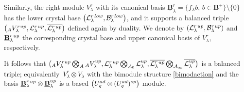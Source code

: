 \documentclass[11pt]{article}
\numberwithin{equation}{section}
\numberwithin{equation}{section}
\theoremstyle{definition}
\newcommand{\Ll}{{\mathcal L}}
\begin{document}
Similarly, the right module $V_\lambda^r$ with its canonical basis $\underline{\mathbf{B}}_\lambda^r{}=\{f_\lambda b,\, b\in \mathbf{B}^+\}\setminus \{0\}$ has the lower crystal base $\big(\Ll_{\lambda}^r{}^{\rm low},\mathcal{B}_\lambda^r{}^{\rm low}\big)$, and it supports a balanced triple $\big({}_AV_\lambda^r{}^{\rm up},\Ll_{\lambda} ^r{}^{\rm up},\overline{\Ll_{\lambda} ^r{}^{\rm up}}\big)$ defined again by duality. We denote by $(\Ll_{\lambda}^r{}^{\rm up},\mathcal{B}_\lambda^r{}^{\rm up})$ and $\underline{\mathbf{B}}_\lambda^r{}^{\rm up}$ the corresponding crystal base and upper canonical basis of $V_\lambda^r$, respectively.

It follows that $\big({}_AV_\lambda^r{}^{\rm up}\bigotimes_A {}_AV_\lambda^{\rm up},\Ll_{\lambda}^r{}^{\rm up} \bigotimes_{\mathcal{A}_0}\Ll_{\lambda}^{\rm up},\overline{\Ll_{\lambda}^r{}^{\rm up}}\bigotimes_{\mathcal{A}_\infty}\overline{\Ll_{\lambda}^{\rm up}}\big)$ is a balanced triple; equivalently~${V_\lambda^r \otimes V_\lambda}$ with the bimodule structure \eqref{bimodaction} and the basis $\underline{\mathbf{B}}_\lambda^r{}^{\rm up}\otimes \underline{\mathbf{B}}_\lambda^{\rm up}$ is a based $\big(U_q^{\rm ad} \otimes (U_q^{\rm ad})^{\rm op}\big)$-module.
\end{document}
